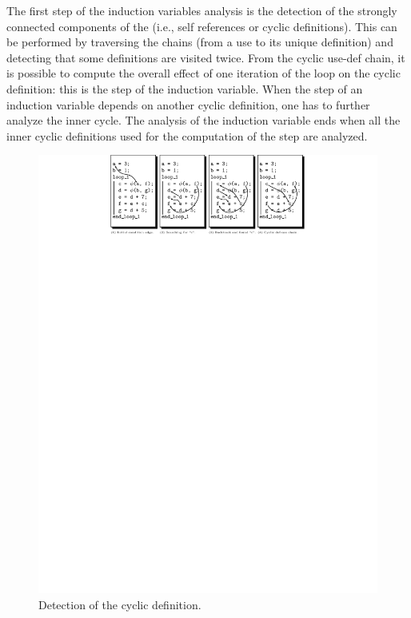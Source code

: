 The first step of the induction variables analysis is the detection of
the strongly connected components of the \SSA{} (i.e., self references
or cyclic definitions).  This can be performed by traversing the
\SSA{} chains (from a use to its unique definition) and detecting that
some definitions are visited twice.  From the cyclic use-def chain, it
is possible to compute the overall effect of one iteration of the loop
on the cyclic definition: this is the step of the induction variable.
When the step of an induction variable depends on another cyclic
definition, one has to further analyze the inner cycle.  The analysis
of the induction variable ends when all the inner cyclic definitions
used for the computation of the step are analyzed.

\begin{figure}[h]
  \begin{center}
    \includegraphics[width=1.2\textwidth]{fig/iv_step}
  \end{center}
  \vspace{-50em}
  \caption{Detection of the cyclic definition.}
  \label{spop:fig:ivstep}
\end{figure}

